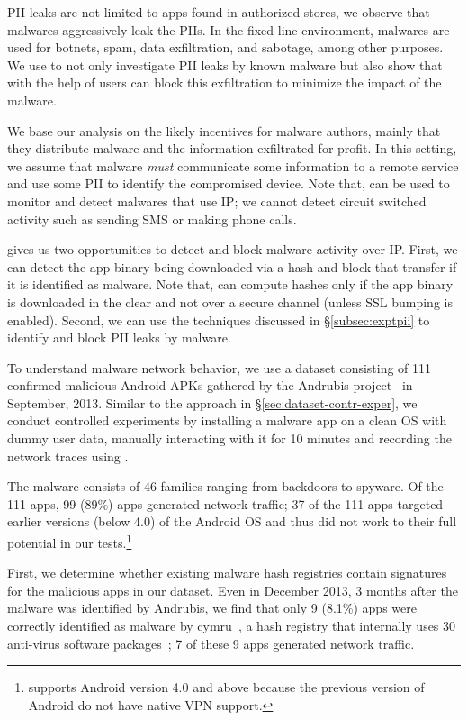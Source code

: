 PII leaks are not limited to apps found in authorized stores, we observe that malwares aggressively leak the PIIs.
In the fixed-line environment, malwares are used for botnets, spam, data exfiltration, and sabotage, among other purposes. 
We use \meddle to not only investigate PII leaks by known malware but also show that with the help of \meddle users can block this exfiltration to minimize the impact of the malware.

We base our analysis on the likely incentives for malware authors, mainly that they distribute malware and the information exfiltrated for profit. 
In this setting, we assume that malware \emph{must} communicate some information to a remote service and use some PII to identify the compromised device.
Note that, \meddle can be used to monitor and detect malwares that use IP; we cannot detect circuit switched activity such as sending SMS or making phone calls.

\meddle gives us two opportunities to detect and block malware activity over IP. 
First, we can detect the app binary being downloaded via a hash and block that transfer if it is identified as malware. 
Note that, \meddle can compute hashes only if the app binary is downloaded in the clear and not over a secure channel (unless SSL bumping is enabled).
Second, we can use the techniques discussed in \S\ref{subsec:exptpii} to identify and block PII leaks by malware. 

To understand malware network behavior, we use a dataset consisting of 111 confirmed malicious Android APKs gathered by the Andrubis project~\cite{andrubis} in September, 2013.  
Similar to the approach in \S\ref{sec:dataset-contr-exper}, we conduct controlled experiments by installing a malware app on a clean OS with dummy user data, manually interacting with it for 10 minutes and recording the network traces using \meddle. 

The malware consists of 46 families ranging from backdoors to spyware. 
Of the 111 apps, 99 (89\%) apps generated network traffic; 37 of the 111 apps targeted earlier versions (below 4.0) of the Android OS and thus did not work to their full potential in our tests.\footnote{\meddle supports Android version 4.0 and above because the previous version of Android do not have native VPN support.}

First, we determine whether existing malware hash registries contain signatures for the malicious apps in our dataset. 
Even in December 2013, 3 months after the malware was identified by Andrubis, we find that only 9 (8.1\%) apps were correctly identified as malware by cymru~\cite{cymru}, a hash registry that internally uses 30 anti-virus software packages~\cite{cymru:hash}; 7 of these 9 apps generated network traffic. 


